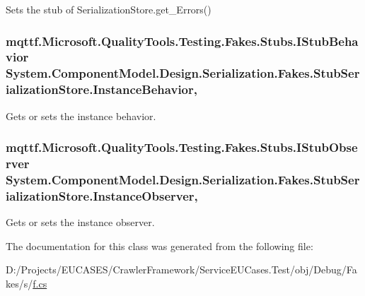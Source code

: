 Sets the stub of Serialization\-Store.\-get\-\_\-\-Errors()

\hypertarget{class_system_1_1_component_model_1_1_design_1_1_serialization_1_1_fakes_1_1_stub_serialization_store_a345800553a81450349090ebbb40f1687}{
\subsubsection[{Instance\-Behavior}]{\setlength{\rightskip}{0pt plus 5cm}mqttf.\-Microsoft.\-Quality\-Tools.\-Testing.\-Fakes.\-Stubs.\-I\-Stub\-Behavior System.\-Component\-Model.\-Design.\-Serialization.\-Fakes.\-Stub\-Serialization\-Store.\-Instance\-Behavior\hspace{0.3cm}{\ttfamily [get]}, {\ttfamily [set]}}}\label{class_system_1_1_component_model_1_1_design_1_1_serialization_1_1_fakes_1_1_stub_serialization_store_a345800553a81450349090ebbb40f1687}


Gets or sets the instance behavior.

\hypertarget{class_system_1_1_component_model_1_1_design_1_1_serialization_1_1_fakes_1_1_stub_serialization_store_af729c5c3f007e2cb205feee00e9664a1}{
\subsubsection[{Instance\-Observer}]{\setlength{\rightskip}{0pt plus 5cm}mqttf.\-Microsoft.\-Quality\-Tools.\-Testing.\-Fakes.\-Stubs.\-I\-Stub\-Observer System.\-Component\-Model.\-Design.\-Serialization.\-Fakes.\-Stub\-Serialization\-Store.\-Instance\-Observer\hspace{0.3cm}{\ttfamily [get]}, {\ttfamily [set]}}}\label{class_system_1_1_component_model_1_1_design_1_1_serialization_1_1_fakes_1_1_stub_serialization_store_af729c5c3f007e2cb205feee00e9664a1}


Gets or sets the instance observer.



The documentation for this class was generated from the following file\-:\begin{DoxyCompactItemize}
\item 
D\-:/\-Projects/\-E\-U\-C\-A\-S\-E\-S/\-Crawler\-Framework/\-Service\-E\-U\-Cases.\-Test/obj/\-Debug/\-Fakes/s/\hyperlink{s_2f_8cs}{f.\-cs}\end{DoxyCompactItemize}
